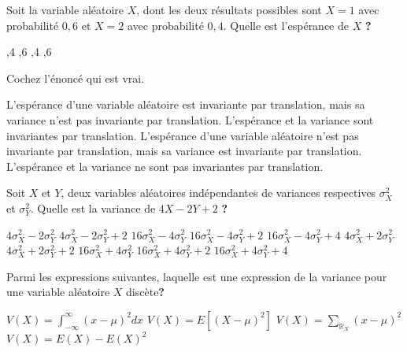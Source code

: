 \pageblanche
\begin{questions}
\question[3] Soit la variable aléatoire $X$, dont les deux résultats possibles sont $X=1$ avec probabilité $0,6$ et $X=2$ avec probabilité $0,4$. Quelle est l'espérance de $X$ \textbf{?}

\begin{oneparcheckboxes}
    ,4
    ,6
    ,4
    ,6
\end{oneparcheckboxes}

\vspace{0.5cm}
\question[3] Cochez l'énoncé qui est vrai.

\begin{checkboxes}
    \choice L'espérance d'une variable aléatoire est invariante par translation, mais sa variance n'est pas invariante par translation.
    \choice L'espérance et la variance sont invariantes par translation.
    \correctchoice L'espérance d'une variable aléatoire n'est pas invariante par translation, mais sa variance est invariante par translation.
    \choice L'espérance et la variance ne sont pas invariantes par translation.
\end{checkboxes}

\vspace{0.5cm}

\question[3] Soit $X$ et $Y$, deux variables aléatoires indépendantes de variances respectives $\sigma^2_X$ et $\sigma^2_Y$. Quelle est la variance de $4X-2Y+2$ \textbf{?}

\begin{checkboxes}
    \choice $4\sigma^2_X-2\sigma^2_Y$
    \choice $4\sigma^2_X-2\sigma^2_Y+2$
    \choice $16\sigma^2_X-4\sigma^2_Y$
    \choice $16\sigma^2_X-4\sigma^2_Y+2$
    \choice $16\sigma^2_X-4\sigma^2_Y+4$
    \choice $4\sigma^2_X+2\sigma^2_Y$
    \choice $4\sigma^2_X+2\sigma^2_Y+2$
    \correctchoice $16\sigma^2_X+4\sigma^2_Y$
    \choice $16\sigma^2_X+4\sigma^2_Y+2$
    \choice $16\sigma^2_X+4\sigma^2_Y+4$
\end{checkboxes}

\vspace{0.5cm}

\question[3] Parmi les expressions suivantes, laquelle est une expression de la variance pour une variable aléatoire $X$ discète\textbf{?}

      \begin{checkboxes}
          \choice $V(X)=\int_{-\infty}^{\infty}(x-\mu)^2dx$
          \correctchoice $V(X)=E[(X-\mu)^2]$
          \choice $V(X)=\sum_{\mathbb{R}_X}(x-\mu)^2$
          \choice $V(X)=E(X)-E(X)^2$
      \end{checkboxes}
          

\end{questions}

